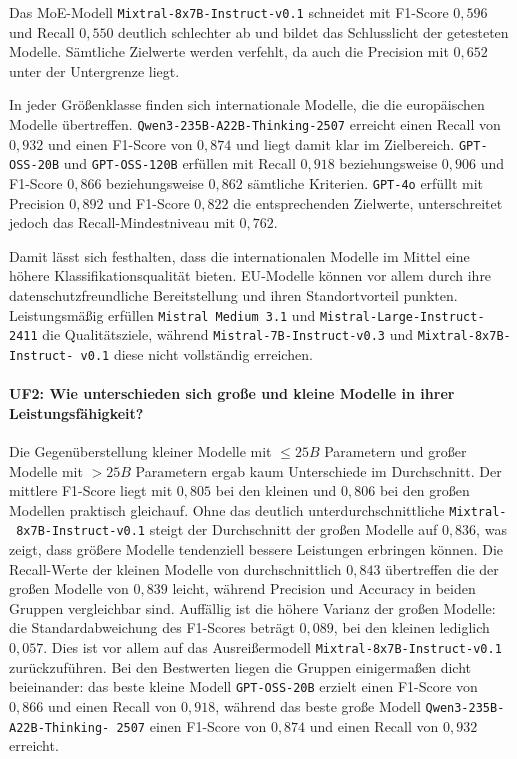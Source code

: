 Das \ac{MoE}-Modell \texttt{Mixtral-8x7B-Instruct-v0.1} schneidet mit F1-Score $0{,}596$ und Recall $0{,}550$ deutlich schlechter ab und bildet das Schlusslicht der getesteten Modelle. Sämtliche Zielwerte werden verfehlt, da auch die Precision mit $0{,}652$ unter der Untergrenze liegt.

In jeder Größenklasse finden sich internationale Modelle, die die europäischen Modelle übertreffen. \texttt{Qwen3-235B-A22B-Thinking-2507} erreicht einen Recall von $0{,}932$ und einen F1-Score von $0{,}874$ und liegt damit klar im Zielbereich. \texttt{GPT-OSS-20B} und \texttt{GPT-OSS-120B} erfüllen mit Recall $0{,}918$ beziehungsweise $0{,}906$ und F1-Score $0{,}866$ beziehungsweise $0{,}862$ sämtliche Kriterien. \texttt{GPT-4o} erfüllt mit Precision $0{,}892$ und F1-Score $0{,}822$ die entsprechenden Zielwerte, unterschreitet jedoch das Recall-Mindestniveau mit $0{,}762$.

Damit lässt sich festhalten, dass die internationalen Modelle im Mittel eine höhere Klassifikationsqualität bieten. \ac{EU}-Modelle können vor allem durch ihre datenschutzfreundliche Bereitstellung und ihren Standortvorteil punkten. Leistungsmäßig erfüllen \texttt{Mistral Medium 3.1} und \texttt{Mistral-Large-Instruct-2411} die Qualitätsziele, während \texttt{Mistral-7B-Instruct-v0.3} und \texttt{Mixtral-8x7B-Instruct-\linebreak~v0.1} diese nicht vollständig erreichen.

\paragraph{UF2: Wie unterschieden sich große und kleine Modelle in ihrer Leistungsfähigkeit?}

Die Gegenüberstellung kleiner Modelle mit $\leq 25B$ Parametern und großer Modelle mit $> 25B$ Parametern ergab kaum Unterschiede im Durchschnitt. Der mittlere F1-Score liegt mit $0{,}805$ bei den kleinen und $0{,}806$ bei den großen Modellen praktisch gleichauf. Ohne das deutlich unterdurchschnittliche \texttt{Mixtral-\linebreak~8x7B-Instruct-v0.1} steigt der Durchschnitt der großen Modelle auf $0{,}836$, was zeigt, dass größere Modelle tendenziell bessere Leistungen erbringen können. Die Recall-Werte der kleinen Modelle von durchschnittlich $0{,}843$ übertreffen die der großen Modelle von $0{,}839$ leicht, während Precision und Accuracy in beiden Gruppen vergleichbar sind. Auffällig ist die höhere Varianz der großen Modelle: die Standardabweichung des F1-Scores beträgt $0{,}089$, bei den kleinen lediglich $0{,}057$. Dies ist vor allem auf das Ausreißermodell \texttt{Mixtral-8x7B-Instruct-v0.1} zurückzuführen. Bei den Bestwerten liegen die Gruppen einigermaßen dicht beieinander: das beste kleine Modell \texttt{GPT-OSS-20B} erzielt einen F1-Score von $0{,}866$ und einen Recall von $0{,}918$, während das beste große Modell \texttt{Qwen3-235B-A22B-Thinking-\linebreak~2507} einen F1-Score von $0{,}874$ und einen Recall von $0{,}932$ erreicht.

